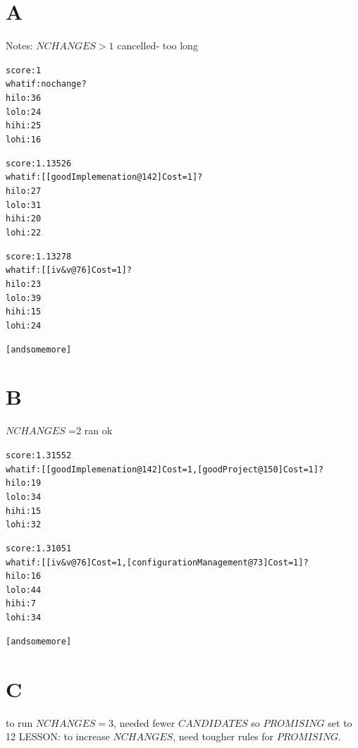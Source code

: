 \documentclass{article}
\begin{document}
\section{A}

Notes: $NCHANGES > 1$ cancelled- too long

{\footnotesize \begin{alltt}
          score :    1
        what if : no change?
           hilo :   36%
           lolo :   24%
           hihi :   25%
           lohi :   16%


          score : 1.13526
        what if : [[goodImplemenation@142]Cost=1]?
           hilo :   27%
           lolo :   31%
           hihi :   20%
           lohi :   22%

          score : 1.13278
        what if : [[iv&v@76]Cost=1]?
           hilo :   23%
           lolo :   39%
           hihi :   15%
           lohi :   24%

        [and some more]
\end{alltt}}



\section{B}

$NCHANGES$ =2 ran ok

 {\footnotesize \begin{alltt}
          score : 1.31552
        what if : [[goodImplemenation@142]Cost=1, [goodProject@150]Cost=1]?
           hilo :   19%
           lolo :   34%
           hihi :   15%
           lohi :   32%

          score : 1.31051
        what if : [[iv&v@76]Cost=1, [configurationManagement@73]Cost=1]?
           hilo :   16%
           lolo :   44%
           hihi :    7%
           lohi :   34%

         [and some more]
\end{alltt}}

\section{C}

to run $NCHANGES=3$, needed fewer $CANDIDATES$
                                                so $PROMISING$ set to 12
                                                LESSON: to increase $NCHANGES$,
                                                need tougher rules for $PROMISING$.
\end{document}
